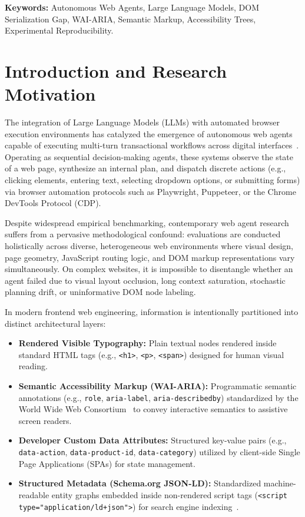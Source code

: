 \documentclass[11pt,a4paper]{article}
\begin{document}
\textbf{Keywords:} Autonomous Web Agents, Large Language Models, DOM Serialization Gap, WAI-ARIA, Semantic Markup, Accessibility Trees, Experimental Reproducibility.

\section{Introduction and Research Motivation}
\label{sec:intro}

The integration of Large Language Models (LLMs) with automated browser execution environments has catalyzed the emergence of autonomous web agents capable of executing multi-turn transactional workflows across digital interfaces~\cite{zhou2024webarena, deng2023mind2web, drouin2024workarena}. Operating as sequential decision-making agents, these systems observe the state of a web page, synthesize an internal plan, and dispatch discrete actions (e.g., clicking elements, entering text, selecting dropdown options, or submitting forms) via browser automation protocols such as Playwright, Puppeteer, or the Chrome DevTools Protocol (CDP).

Despite widespread empirical benchmarking, contemporary web agent research suffers from a pervasive methodological confound: evaluations are conducted holistically across diverse, heterogeneous web environments where visual design, page geometry, JavaScript routing logic, and DOM markup representations vary simultaneously. On complex websites, it is impossible to disentangle whether an agent failed due to visual layout occlusion, long context saturation, stochastic planning drift, or uninformative DOM node labeling.

In modern frontend web engineering, information is intentionally partitioned into distinct architectural layers:
\begin{itemize}
    \item \textbf{Rendered Visible Typography:} Plain textual nodes rendered inside standard HTML tags (e.g., \texttt{<h1>}, \texttt{<p>}, \texttt{<span>}) designed for human visual reading.
    \item \textbf{Semantic Accessibility Markup (WAI-ARIA):} Programmatic semantic annotations (e.g., \texttt{role}, \texttt{aria-label}, \texttt{aria-describedby}) standardized by the World Wide Web Consortium~\cite{wai_aria11} to convey interactive semantics to assistive screen readers.
    \item \textbf{Developer Custom Data Attributes:} Structured key-value pairs (e.g., \texttt{data-action}, \texttt{data-product-id}, \texttt{data-category}) utilized by client-side Single Page Applications (SPAs) for state management.
    \item \textbf{Structured Metadata (Schema.org JSON-LD):} Standardized machine-readable entity graphs embedded inside non-rendered script tags (\texttt{<script type="application/ld+json">}) for search engine indexing~\cite{schemaorg}.
\end{itemize}
\end{document}
